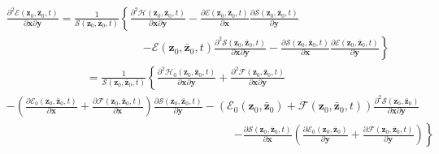 \documentclass[aps,preprint]{revtex4}%
\begin{document}
\begin{align}
&  \frac{\partial^{2}\mathcal{E}\left(  \mathbf{z}_{0},\mathbf{\bar{z}}%
_{0},t\right)  }{\partial\mathbf{x}\partial\mathbf{y}}=\frac{1}{\mathcal{S}%
\left(  \mathbf{z}_{0},\mathbf{\bar{z}}_{0},t\right)  }\left\{  \frac
{\partial^{2}\mathcal{H}\left(  \mathbf{z}_{0},\mathbf{\bar{z}}_{0},t\right)
}{\partial\mathbf{x}\partial\mathbf{y}}-\frac{\partial\mathcal{E}\left(
\mathbf{z}_{0},\mathbf{\bar{z}}_{0},t\right)  }{\partial\mathbf{x}}%
\frac{\partial\mathcal{S}\left(  \mathbf{z}_{0},\mathbf{\bar{z}}_{0},t\right)
}{\partial\mathbf{y}}\right.  \nonumber\\
&  \qquad\qquad\qquad\qquad\qquad\qquad\left.  -\mathcal{E}\left(
\mathbf{z}_{0},\mathbf{\bar{z}}_{0},t\right)  \frac{\partial^{2}%
\mathcal{S}\left(  \mathbf{z}_{0},\mathbf{\bar{z}}_{0},t\right)  }%
{\partial\mathbf{x}\partial\mathbf{y}}-\frac{\partial\mathcal{S}\left(
\mathbf{z}_{0},\mathbf{\bar{z}}_{0},t\right)  }{\partial\mathbf{x}}%
\frac{\partial\mathcal{E}\left(  \mathbf{z}_{0},\mathbf{\bar{z}}_{0},t\right)
}{\partial\mathbf{y}}\right\}  \nonumber\\
&  \qquad\qquad\qquad\quad\left.  =\right.  \frac{1}{\mathcal{S}\left(
\mathbf{z}_{0},\mathbf{\bar{z}}_{0},t\right)  }\left\{  \frac{\partial
^{2}\mathcal{H}_{0}\left(  \mathbf{z}_{0},\mathbf{\bar{z}}_{0},t\right)
}{\partial\mathbf{x}\partial\mathbf{y}}+\frac{\partial^{2}\mathcal{F}\left(
\mathbf{z}_{0},\mathbf{\bar{z}}_{0},t\right)  }{\partial\mathbf{x}%
\partial\mathbf{y}}\right.  \nonumber\\
&  -\left(  \frac{\partial\mathcal{E}_{0}\left(  \mathbf{z}_{0},\mathbf{\bar
{z}}_{0},t\right)  }{\partial\mathbf{x}}+\frac{\partial\mathcal{F}\left(
\mathbf{z}_{0},\mathbf{\bar{z}}_{0},t\right)  }{\partial\mathbf{x}}\right)
\frac{\partial\mathcal{S}\left(  \mathbf{z}_{0},\mathbf{\bar{z}}_{0},t\right)
}{\partial\mathbf{y}}-\left(  \mathcal{E}_{0}\left(  \mathbf{z}_{0}%
,\mathbf{\bar{z}}_{0}\right)  +\mathcal{F}\left(  \mathbf{z}_{0}%
,\mathbf{\bar{z}}_{0},t\right)  \right)  \frac{\partial^{2}\mathcal{S}\left(
\mathbf{z}_{0},\mathbf{\bar{z}}_{0}\right)  }{\partial\mathbf{x}%
\partial\mathbf{y}}\nonumber\\
&  \qquad\qquad\qquad\qquad\qquad\qquad\qquad\qquad\qquad\qquad\left.
-\frac{\partial\mathcal{S}\left(  \mathbf{z}_{0},\mathbf{\bar{z}}%
_{0},t\right)  }{\partial\mathbf{x}}\left(  \frac{\partial\mathcal{E}%
_{0}\left(  \mathbf{z}_{0},\mathbf{\bar{z}}_{0}\right)  }{\partial\mathbf{y}%
}+\frac{\partial\mathcal{F}\left(  \mathbf{z}_{0},\mathbf{\bar{z}}%
_{0},t\right)  }{\partial\mathbf{y}}\right)  \right\}
\end{align}
\end{document}
